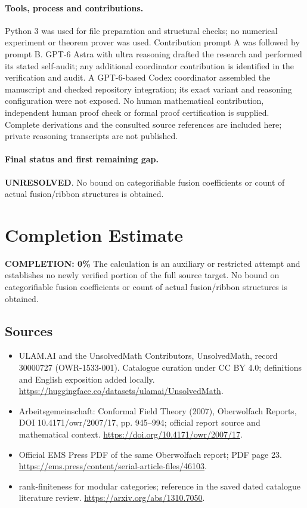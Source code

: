 \documentclass[11pt]{article}
\begin{document}
\paragraph{Tools, process and contributions.}
Python 3 was used for file preparation and structural checks; no numerical experiment or theorem prover was used. Contribution prompt A was followed by prompt B. GPT-6 Astra with ultra reasoning drafted the research and performed its stated self-audit; any additional coordinator contribution is identified in the verification and audit. A GPT-6-based Codex coordinator assembled the manuscript and checked repository integration; its exact variant and reasoning configuration were not exposed. No human mathematical contribution, independent human proof check or formal proof certification is supplied. Complete derivations and the consulted source references are included here; private reasoning transcripts are not published.

\paragraph{Final status and first remaining gap.}
\textbf{UNRESOLVED}. No bound on categorifiable fusion coefficients or count of actual fusion/ribbon structures is obtained.

\section{Completion Estimate}
\noindent\textbf{COMPLETION: 0\%}
The calculation is an auxiliary or restricted attempt and establishes no newly verified portion of the full source target. No bound on categorifiable fusion coefficients or count of actual fusion/ribbon structures is obtained.

\subsection{Sources}
\begin{itemize}
\item[\hypertarget{source:30000727:1}{S1}] ULAM.AI and the UnsolvedMath Contributors, UnsolvedMath, record 30000727 (OWR-1533-001). Catalogue curation under CC BY 4.0; definitions and English exposition added locally.
\url{https://huggingface.co/datasets/ulamai/UnsolvedMath}.
\item[\hypertarget{source:30000727:2}{S2}] Arbeitsgemeinschaft: Conformal Field Theory (2007), Oberwolfach Reports, DOI 10.4171/owr/2007/17, pp. 945--994; official report source and mathematical context.
\url{https://doi.org/10.4171/owr/2007/17}.
\item[\hypertarget{source:30000727:3}{S3}] Official EMS Press PDF of the same Oberwolfach report; PDF page 23.
\url{https://ems.press/content/serial-article-files/46103}.
\item[\hypertarget{source:30000727:4}{S4}] rank-finiteness for modular categories; reference in the saved dated catalogue literature review.
\url{https://arxiv.org/abs/1310.7050}.
\end{itemize}
\label{end:30000727}
\end{document}
